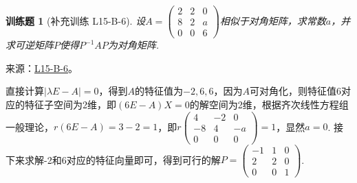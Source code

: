 \documentclass[UTF8,12pt,a4paper,fontset=fandol]{ctexart}
\newtheorem{exercise}{训练题}[section]
\begin{document}
\begin{exercise}[补充训练 L15-B-6]\label{prob:L15-B-6}
设$A=\begin{pmatrix}
                2 & 2 & 0 \\ 8 & 2 & a \\ 0 & 0 & 6
            \end{pmatrix}$相似于对角矩阵，求常数$a$，并求可逆矩阵$P$使得$P^{-1}AP$为对角矩阵.
\end{exercise}
\noindent 来源：\href{https://github.com/yhwu-is/Linear-Algebra-Left-Undone/blob/new/%E8%AE%B2%E4%B9%89/%E4%B8%93%E9%A2%98/15%20%E7%9B%B8%E4%BC%BC%E6%A0%87%E5%87%86%E5%BD%A2%EF%BC%9A%E5%A4%8D%E6%95%B0%E5%9F%9F%E4%B8%8A%E7%9A%84%E5%B0%9D%E8%AF%95%E4%B8%8E%E7%90%86%E8%AE%BA.tex}{L15-B-6}。
\begin{solve}
直接计算$|\lambda E-A|=0$，得到$A$的特征值为$-2,6,6$，因为$A$可对角化，则特征值6对应的特征子空间为2维，即$(6E-A)X=0$的解空间为2维，根据齐次线性方程组一般理论，$r(6E-A)=3-2=1$，即$r\begin{pmatrix}
                4 & -2 & 0 \\ -8 & 4 & -a \\ 0 & 0 & 0
            \end{pmatrix}=1$，显然$a=0$. 接下来求解-2和6对应的特征向量即可，得到可行的解$P=\begin{pmatrix}
                -1 & 1 & 0 \\ 2 & 2 & 0 \\ 0 & 0 & 1
            \end{pmatrix}$.
\end{solve}
\end{document}
